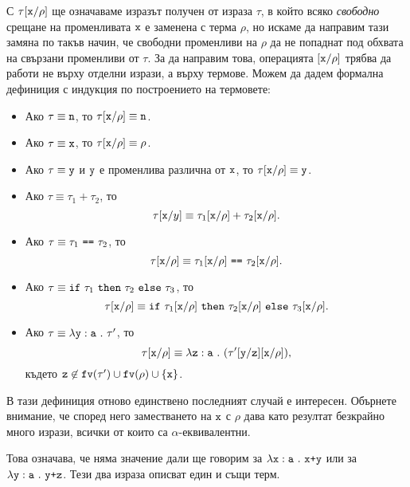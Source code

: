 С $\tau[\texttt{x}/{\rho}]$ ще означаваме изразът получен от израза $\tau$, в който всяко \emph{свободно} срещане на променливата $\texttt{x}$
е заменена с терма $\rho$, но искаме да направим тази замяна по такъв начин, че свободни променливи на $\rho$
да не попаднат под обхвата на свързани променливи от $\tau$. За да направим това, операцията $[\texttt{x}/{\rho}]$
трябва да работи не върху отделни изрази, а върху термове.
Можем да дадем формална дефиниция с индукция по построението на термовете:
\begin{itemize}
\item
  Ако $\tau \equiv \texttt{n}$, то $\tau[\texttt{x}/{\rho}] \equiv \texttt{n}$.
\item
  Ако $\tau \equiv \texttt{x}$, то $\tau[\texttt{x}/{\rho}] \equiv \rho$.
\item
  Ако $\tau \equiv \texttt{y}$ и $\texttt{y}$ е променлива различна от $\texttt{x}$, то $\tau[\texttt{x}/{\rho}] \equiv \texttt{y}$.
\item
  Ако $\tau \equiv \tau_1 + \tau_2$, то
  \[\tau[\texttt{x}/{y}] \equiv \tau_1[\texttt{x}/{\rho}] + \tau_2[\texttt{x}/{\rho}].\]
\item
  Ако $\tau \equiv \tau_1\ \vv{==}\ \tau_2$, то
  \[\tau\subst{x}{\rho} \equiv \tau_1\subst{x}{\rho}\ \vv{==}\ \tau_2\subst{x}{\rho}.\]
\item
  Ако $\tau \equiv \texttt{if}\ \tau_1\ \texttt{then}\ \tau_2\ \texttt{else}\ \tau_3$, то
  \[\tau[\texttt{x}/{\rho}] \equiv \texttt{if}\ \tau_1[\texttt{x}/{\rho}]\ \texttt{then}\ \tau_2[\texttt{x}/{\rho}]\ \texttt{else}\ \tau_3[\texttt{x}/{\rho}].\]
\item
  Ако $\tau \equiv \lambda\texttt{y}:\texttt{a}\ .\ {\tau'}$, то
  \[\tau[\texttt{x}/{\rho}] \equiv \lambda\texttt{z}:\texttt{a}\ .\ {(\tau'[\texttt{y}/{\texttt{z}}][\texttt{x}/{\rho}])},\]
  където $\texttt{z} \not\in \texttt{fv}(\tau') \cup \texttt{fv}(\rho) \cup \{\texttt{x}\}$.
\end{itemize}

В тази дефиниция отново единствено последният случай е интересен.
Обърнете внимание, че според него заместването на $\texttt{x}$ с $\rho$ дава като резултат безкрайно много
изрази, всички от които са $\alpha$-еквивалентни.

Това означава, че няма значение дали ще говорим за $\lambda\texttt{x}:\texttt{a}\ .\ {\texttt{x+y}}$ или за $\lambda\texttt{y}:\texttt{a}\ .\ {\texttt{y+z}}$.
Тези два израза описват един и същи терм.

